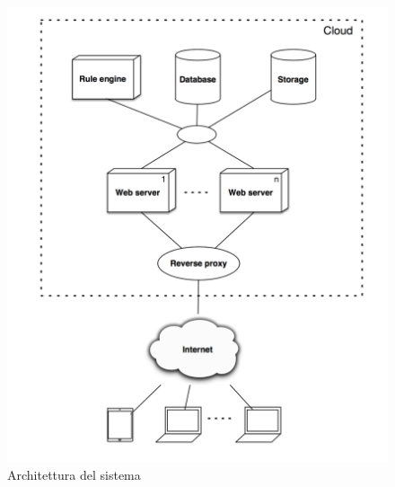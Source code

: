 \begin{figure}[H]
	\begin{center}
		\includegraphics[width=16cm]{Pics/architettura.png}
		\caption{Architettura del sistema}
		\label{fig:Architettura}
	\end{center}
\end{figure}

